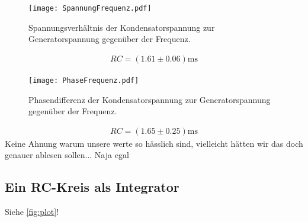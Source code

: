 \begin{figure}[H]
  \centering
  \texttt{[image: SpannungFrequenz.pdf]}
  \caption{Spannungsverhältnis der Kondensatorspannung zur Generatorspannung gegenüber der Frequenz.}
  \label{fig:SpannungFrequenz_plot}
\end{figure}

\begin{align*}
  RC=(1.61 ± 0.06)\si{\milli\second}
\end{align*}

\begin{figure}[H]
  \centering
  \texttt{[image: PhaseFrequenz.pdf]}
  \caption{Phasendifferenz der Kondensatorspannung zur Generatorspannung gegenüber der Frequenz.}
  \label{fig:PhaseFrequenz_plot}
\end{figure}
\begin{align*}
  RC=(1.65 ± 0.25)\si{\milli\second}
\end{align*}
Keine Ahnung warum unsere werte so hässlich sind, vielleicht hätten wir das doch genauer ablesen sollen... Naja egal 

\subsection{Ein RC-Kreis als Integrator} %
\label{sub:Integrator}




Siehe \autoref{fig:plot}!
